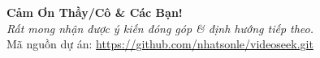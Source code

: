 \documentclass[aspectratio=169, 10pt]{beamer}
\begin{document}
\begin{frame}
    \vspace{1.5cm}
    \centering
    \Huge \textbf{\textcolor{primaryBlue}{Cảm Ơn Thầy/Cô \& Các Bạn!}} \\
    \vspace{0.8cm}
    \normalsize \textit{Rất mong nhận được ý kiến đóng góp \& định hướng tiếp theo.} \\
    \vspace{0.5cm}
    \small
    Mã nguồn dự án: \url{https://github.com/nhatsonle/videoseek.git}
\end{frame}
\end{document}
